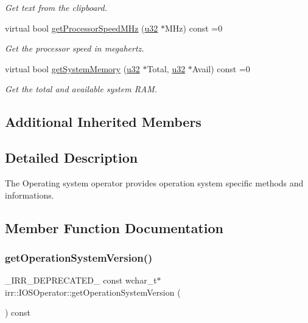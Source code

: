 \begin{DoxyCompactItemize}
\begin{DoxyCompactList}\small\item\em Get text from the clipboard. \end{DoxyCompactList}\item 
virtual bool \hyperlink{classirr_1_1IOSOperator_abc61b8016ec35125ef94adea42209ecd}{get\+Processor\+Speed\+M\+Hz} (\hyperlink{namespaceirr_a0416a53257075833e7002efd0a18e804}{u32} $\ast$M\+Hz) const =0
\begin{DoxyCompactList}\small\item\em Get the processor speed in megahertz. \end{DoxyCompactList}\item 
virtual bool \hyperlink{classirr_1_1IOSOperator_af58b50cecf28f247e1f302ee0b9e8270}{get\+System\+Memory} (\hyperlink{namespaceirr_a0416a53257075833e7002efd0a18e804}{u32} $\ast$Total, \hyperlink{namespaceirr_a0416a53257075833e7002efd0a18e804}{u32} $\ast$Avail) const =0
\begin{DoxyCompactList}\small\item\em Get the total and available system R\+AM. \end{DoxyCompactList}\end{DoxyCompactItemize}
\subsection*{Additional Inherited Members}


\subsection{Detailed Description}
The Operating system operator provides operation system specific methods and informations. 

\subsection{Member Function Documentation}
\mbox{\label{classirr_1_1IOSOperator_a8d634ee79439742b7397ca7ad7a3812a}} 
\subsubsection{\texorpdfstring{get\+Operation\+System\+Version()}{getOperationSystemVersion()}\hspace{0.1cm}{\footnotesize\ttfamily [1/2]}}
{\footnotesize\ttfamily \+\_\+\+I\+R\+R\+\_\+\+D\+E\+P\+R\+E\+C\+A\+T\+E\+D\+\_\+ const wchar\+\_\+t$\ast$ irr\+::\+I\+O\+S\+Operator\+::get\+Operation\+System\+Version (\begin{DoxyParamCaption}{ }\end{DoxyParamCaption}) const\hspace{0.3cm}{\ttfamily [inline]}}



